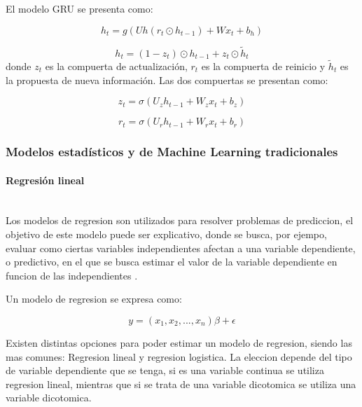     El modelo GRU se presenta como:

    \begin{equation}
        h_t = g(Uh(r_t \odot h_{t-1}) + Wx_t + b_h)
    \end{equation}

    \begin{equation}
    h_t = (1 - z_t) \odot h_{t-1} + z_t \odot \tilde{h}_t
    \end{equation}
    donde $z_t$ es la compuerta de actualización, $r_t$ es la compuerta de reinicio y $\tilde{h}_t$ es la propuesta de nueva información. Las dos compuertas se presentan como:

    \begin{equation}
        z_t = \sigma (U_z h_{t-1} + W_z x_t + b_z)
    \end{equation}

    \begin{equation}
        r_t = \sigma (U_r h_{t-1} + W_r x_t + b_r)
    \end{equation}

\subsubsection{Modelos estadísticos y de Machine Learning tradicionales}
    \paragraph{Regresión lineal}\mbox{}\\
    Los modelos de regresion son utilizados para resolver problemas de prediccion, el objetivo de este modelo puede ser explicativo, donde se busca, por ejempo, evaluar como ciertas variables independientes afectan a una variable dependiente, o predictivo, en el que se busca estimar el valor de la variable dependiente en funcion de las independientes \cite{pelaez2016modelos}.

    Un modelo de regresion se expresa como: 

    \begin{equation}
    y = (x_1, x_2, ..., x_n) \beta + \epsilon
    \end{equation}

    Existen distintas opciones para poder estimar un modelo de regresion, siendo las mas comunes: Regresion lineal  y regresion logistica. La eleccion depende del tipo de variable dependiente que se tenga, si es una variable continua se utiliza regresion lineal, mientras que si se trata de una variable dicotomica se utiliza una variable dicotomica.


